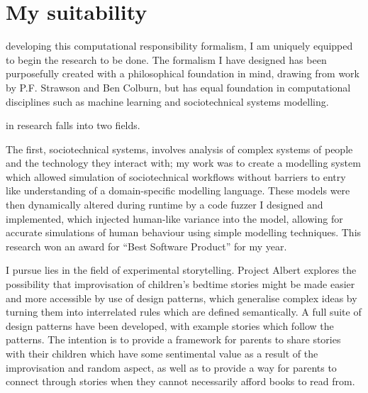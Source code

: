 \section{My suitability}

 developing this computational responsibility formalism, I am uniquely equipped to begin the research to be done. The formalism I have designed has been purposefully created with a philosophical foundation in mind, drawing from work by P.F. Strawson\cite{freedomandresentment} and Ben Colburn, but has equal foundation in computational disciplines such as machine learning and sociotechnical systems modelling\cite{sommerville_resp_depend}.\par

 in research falls into two fields. \par

The first, sociotechnical systems, involves analysis of complex systems of people and the technology they interact with; my work was to create a modelling system which allowed simulation of sociotechnical workflows without barriers to entry like understanding of a domain-specific modelling language. These models were then dynamically altered during runtime by a code fuzzer I designed and implemented, which injected human-like variance into the model, allowing for accurate simulations of human behaviour using simple modelling techniques. This research won an award for ``Best Software Product'' for my year.\par

 I pursue lies in the field of experimental storytelling. Project Albert explores the possibility that improvisation of children's bedtime stories might be made easier and more accessible by use of design patterns, which generalise complex ideas by turning them into interrelated rules which are defined semantically. A full suite of design patterns have been developed, with example stories which follow the patterns. The intention is to provide a framework for parents to share stories with their children which have some sentimental value as a result of the improvisation and random aspect, as well as to provide a way for parents to connect through stories when they cannot necessarily afford books to read from. 




